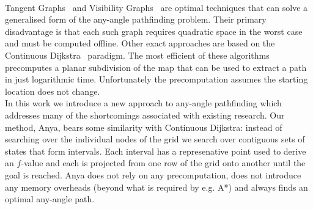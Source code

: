 \\
Tangent Graphs~\cite{liu92} and Visibility Graphs~\cite{lozanoperez79} are 
optimal techniques that can solve a generalised form of the any-angle pathfinding 
problem. Their primary disadvantage is that each such graph requires quadratic 
space in the worst case and must be computed offline.
Other exact approaches are based on the 
Continuous Dijkstra~\cite{mitchell87} paradigm.
The most efficient of these algorithms~\cite{hershberger99} precomputes a 
planar subdivision of the map that can be used to extract a path in just
logarithmic time. Unfortunately the precomputation assumes the starting location
does not change.
\\
In this work we introduce a new approach to any-angle pathfinding 
which addresses many of the shortcomings associated with existing research.
Our method, Anya, bears some similarity with Continuous Dijkstra: 
instead of searching over the individual nodes of the grid we 
search over contiguous sets of states that form intervals.
Each interval has a represenative point used to derive an $f$-value
and each is projected from one row of the grid onto another until the 
goal is reached.
Anya does not rely on any precomputation, does not introduce any
memory overheads (beyond what is required by e.g. A*) and always finds 
an optimal any-angle path.


